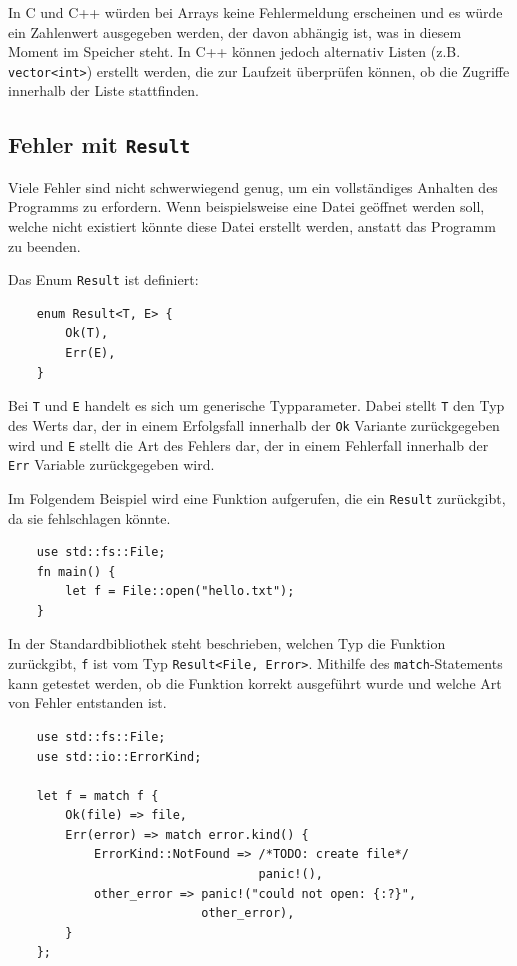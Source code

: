 In C und C++ würden bei Arrays keine Fehlermeldung erscheinen und es würde ein Zahlenwert ausgegeben werden, der davon abhängig ist, was in diesem Moment im Speicher steht. In C++ können jedoch alternativ Listen (z.B. \verb"vector<int>") erstellt werden, die zur Laufzeit überprüfen können, ob die Zugriffe innerhalb der Liste stattfinden.

\subsection{Fehler mit \texttt{Result}}

Viele Fehler sind nicht schwerwiegend genug, um ein vollständiges Anhalten des Programms zu erfordern. Wenn beispielsweise eine Datei geöffnet werden soll, welche nicht existiert könnte diese Datei erstellt werden, anstatt das Programm zu beenden.

Das Enum \verb"Result" ist definiert:

\begin{lstlisting}
    enum Result<T, E> {
        Ok(T),
        Err(E),
    }
\end{lstlisting}

Bei \verb"T" und \verb"E" handelt es sich um generische Typparameter. Dabei stellt \verb"T" den Typ des Werts dar, der in einem Erfolgsfall innerhalb der \verb"Ok" Variante zurückgegeben wird und \verb"E" stellt die Art des Fehlers dar, der in einem Fehlerfall innerhalb der \verb"Err" Variable zurückgegeben wird.

Im Folgendem Beispiel wird eine Funktion aufgerufen, die ein \verb"Result" zurückgibt, da sie fehlschlagen könnte.

\begin{lstlisting}
    use std::fs::File;
    fn main() {
        let f = File::open("hello.txt");
    }
\end{lstlisting}

In der Standardbibliothek steht beschrieben, welchen Typ die Funktion zu\-rück\-gibt, \verb"f" ist vom Typ \verb"Result<File, Error>". Mithilfe des \verb"match"-Statements kann getestet werden, ob die Funktion korrekt ausgeführt wurde und welche Art von Fehler entstanden ist.

\begin{lstlisting}
    use std::fs::File;
    use std::io::ErrorKind;

    let f = match f {
        Ok(file) => file,
        Err(error) => match error.kind() {
            ErrorKind::NotFound => /*TODO: create file*/
                                   panic!(),
            other_error => panic!("could not open: {:?}",
                           other_error),
        }
    };
\end{lstlisting}

